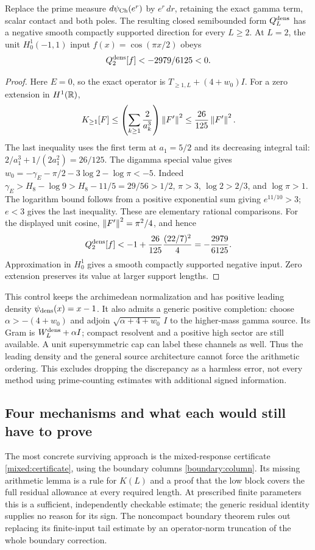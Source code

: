 \begin{theorem}\label{sign:density}
Replace the prime measure $d\psi_{\rm Ch}(e^r)$ by $e^r\,dr$,
retaining the exact gamma term, scalar contact and both poles.
The resulting closed semibounded form $Q_L^{\rm dens}$ has a
negative smooth compactly supported direction for every $L\ge2$.
At $L=2$, the unit $H_0^1(-1,1)$ input $f(x)=\cos(\pi x/2)$ obeys
\begin{equation}\label{sign:density-bound}
Q_2^{\rm dens}[f]<-2979/6125<0.
\end{equation}
\end{theorem}
\begin{proof}
Here $E=0$, so the exact operator is
$T_{\ge1,L}+(4+w_0)I$. For a zero extension in $H^1(\mathbb R)$,
\[
K_{\ge1}[F]\le
\left(\sum_{k\ge1}\frac2{a_k^3}\right)\left\lVert F'\right\rVert^2
\le\frac{26}{125}\left\lVert F'\right\rVert^2.
\]
The last inequality uses the first term at $a_1=5/2$ and its
 decreasing integral tail:
$2/a_1^3+1/(2a_1^2)=26/125$.
The digamma special value gives
$w_0=-\gamma_E-\pi/2-3\log2-\log\pi<-5$. Indeed
$\gamma_E>H_8-\log9>H_8-11/5=29/56>1/2$,
$\pi>3$, $\log2>2/3$, and $\log\pi>1$.
The logarithm bound follows from a positive exponential sum
 giving $e^{11/10}>3$; $e<3$ gives the last inequality.
These are elementary rational comparisons.
For the displayed unit cosine, $\left\lVert F'\right\rVert^2=\pi^2/4$, and hence
\[
Q_2^{\rm dens}[f]<-1+\frac{26}{125}\frac{(22/7)^2}{4}
                  =-\frac{2979}{6125}.
\]
Approximation in $H_0^1$ gives a smooth compactly supported
negative input. Zero extension preserves its value at larger
support lengths.
\end{proof}
This control keeps the archimedean normalization and has positive
leading density $\psi_{\rm dens}(x)=x-1$. It also admits a generic
positive completion: choose $\alpha>-(4+w_0)$ and adjoin
$\sqrt{\alpha+4+w_0}\,I$ to the higher-mass gamma source.
Its Gram is $W_L^{\rm dens}+\alpha I$; compact resolvent and a
positive high sector are still available. A unit supersymmetric
cap can label these channels as well.
Thus the leading density and the general source architecture
cannot force the arithmetic ordering. This excludes dropping
 the discrepancy as a harmless error, not every method using
prime-counting estimates with additional signed information.

\subsection{Four mechanisms and what each would still have to prove}
The most concrete surviving approach is the mixed-response
certificate \eqref{mixed:certificate}, using the boundary columns
\eqref{boundary:column}. Its missing arithmetic lemma is a rule
for $K(L)$ and a proof that the low block covers the full
residual allowance at every required length. At prescribed finite
parameters this is a sufficient, independently checkable estimate;
the generic residual identity supplies no reason for its sign.
The noncompact boundary theorem rules out replacing its finite-input
tail estimate by an operator-norm truncation of the whole boundary
correction.

